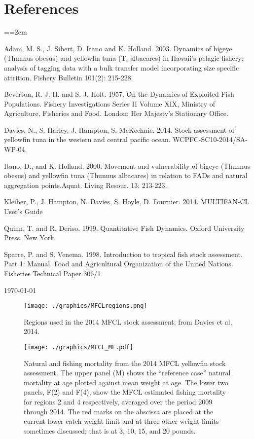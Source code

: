 \documentclass[12pt,letterpaper,twoside]{article}
\begin{document}
\section*{References}
{\parindent=0cm \small
\everypar={\hangindent=2em }\par
Adam, M. S., J. Sibert, D. Itano and K. Holland. 2003. Dynamics of
bigeye (Thunnus obesus) and yellowfin tuna (T. albacares) in Hawaii's
pelagic fishery: analysis of tagging data with a bulk transfer model
incorporating size specific attrition. Fishery Bulletin 101(2):
215-228.

Beverton, R. J. H. and S. J. Holt. 1957. On the Dynamics of Exploited
Fish Populations. Fishery Investigations Series II Volume XIX,
Ministry of Agriculture, Fisheries and Food. London: Her Majesty's
Stationary Office.

Davies, N., S. Harley, J. Hampton, S. McKechnie. 2014. Stock
assessment of yellowfin tuna in the western and central pacific ocean.
WCPFC-SC10-2014/SA-WP-04.

Itano, D., and K. Holland. 2000.  Movement and vulnerability of bigeye
(Thunnus obesus) and yellowfin tuna (Thunnus albacares) in relation to
FADs and natural aggregation points.Aquat. Living Resour. 13: 213-223.

Kleiber, P., J. Hampton, N. Davies, S. Hoyle, D. Fournier. 2014.
MULTIFAN-CL User’s Guide

Quinn, T. and R. Deriso. 1999. Quantitative Fish Dynamics. Oxford
University Press, New York.

Sparre, P. and S. Venema. 1998. Introduction to tropical fish stock
assessment. Part 1: Manual. Food and Agricultural Organization of the
United Nations. Fisheries Technical Paper 306/1.
\par}
\vfill
\today
\clearpage

\begin{figure}
\begin{center}
\texttt{[image: ./graphics/MFCLregions.png]}
\caption{\label{fig:mfclreg}
Regions used in the 2014 MFCL stock assessment; from Davies et al,
2014.
}
\end{center}
\end{figure}

\begin{figure}
\begin{center}
\texttt{[image: ./graphics/MFCL\_MF.pdf]}
\caption{\label{fig:mfclmf}
Natural and fishing mortality from the 2014 MFCL yellowfin stock
assessment. The upper panel (M) shows the ``reference case'' natural
mortality at age plotted against mean weight at age.
The lower two panels, F(2) and F(4), show the MFCL estimated fishing
mortality for regions 2 and 4 respectively, averaged over the period
2009 through 2014.
The red marks on the abscissa are placed at
the current lower catch weight limit and at three other
weight limits sometimes discussed; 
that is at 3, 10, 15, and 20 pounds.
}
\end{center}
\end{figure}
\end{document}
